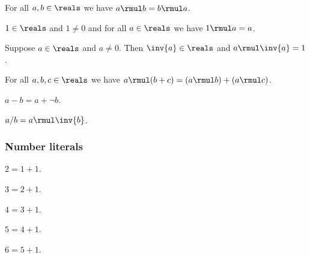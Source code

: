 \begin{axiom}\label{real_mul_comm}
    For all $a, b\in\reals$ we have $a \rmul b = b \rmul a$.
\end{axiom}

\begin{axiom}\label{real_mul_ident}
    $1\in\reals$ and $1\neq 0$ and for all $a\in\reals$ we have $1 \rmul a = a$.
\end{axiom}

\begin{axiom}\label{real_mul_inverse}
    Suppose $a\in\reals$ and $a\neq 0$.
    Then $\inv{a}\in\reals$ and $a \rmul \inv{a} = 1$.
\end{axiom}

\begin{axiom}\label{real_distrib}
    For all $a, b, c\in\reals$ we have $a \rmul (b + c) = (a \rmul b) + (a \rmul c)$.
\end{axiom}

\begin{definition}\label{real_sub}
    $a - b = a + \neg{b}$.
\end{definition}

\begin{definition}\label{real_div}
    $a / b = a \rmul \inv{b}$.
\end{definition}

\subsubsection{Number literals}

\begin{axiom} \label{def_of_2}
    $2 = 1 + 1$.
\end{axiom}    

\begin{axiom} \label{def_of_3}
     $3 = 2 + 1$.
\end{axiom}    

\begin{axiom} \label{def_of_4}
    $4 = 3 + 1$.
\end{axiom}    

\begin{axiom} \label{def_of_5}
    $5 = 4 + 1$.
\end{axiom}    

\begin{axiom} \label{def_of_6}
    $6 = 5 + 1$.
\end{axiom}    

